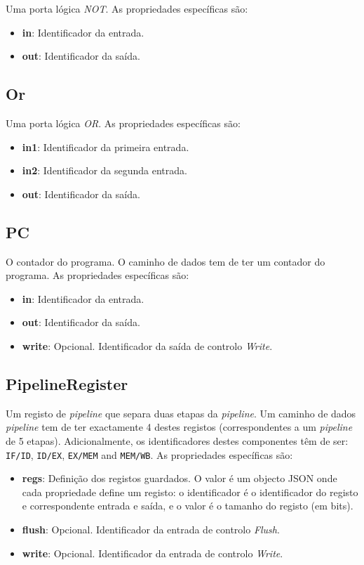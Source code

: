 \documentclass[11pt,a4paper,twoside,titlepage]{report}
\begin{document}
Uma porta lógica \emph{NOT}. As propriedades específicas são:
\begin{itemize}
	\item \textbf{in}: Identificador da entrada.
	\item \textbf{out}: Identificador da saída.
\end{itemize}

\subsection{Or}

Uma porta lógica \emph{OR}. As propriedades específicas são:
\begin{itemize}
	\item \textbf{in1}: Identificador da primeira entrada.
	\item \textbf{in2}: Identificador da segunda entrada.
	\item \textbf{out}: Identificador da saída.
\end{itemize}

\subsection{PC}

O contador do programa. O caminho de dados tem de ter um contador do programa.
As propriedades específicas são:
\begin{itemize}
	\item \textbf{in}: Identificador da entrada.
	\item \textbf{out}: Identificador da saída.
	\item \textbf{write}: Opcional. Identificador da saída de controlo \emph{Write}.
\end{itemize}

\subsection{PipelineRegister}

Um registo de \emph{pipeline} que separa duas etapas da \emph{pipeline}.
Um caminho de dados \emph{pipeline} tem de ter exactamente 4 destes registos
(correspondentes a um \emph{pipeline} de 5 etapas). Adicionalmente, os
identificadores destes componentes têm de ser:
\verb+IF/ID+, \verb+ID/EX+, \verb+EX/MEM+ and \verb+MEM/WB+.
As propriedades específicas são:
\begin{itemize}
	\item \textbf{regs}: Definição dos registos guardados. O valor é um objecto
		JSON onde cada propriedade define um registo: o identificador é o
		identificador do registo e correspondente entrada e saída, e o valor é o
		tamanho do registo (em bits).
	\item \textbf{flush}: Opcional. Identificador da entrada de controlo \emph{Flush}.
	\item \textbf{write}: Opcional. Identificador da entrada de controlo \emph{Write}.
\end{itemize}
\end{document}
